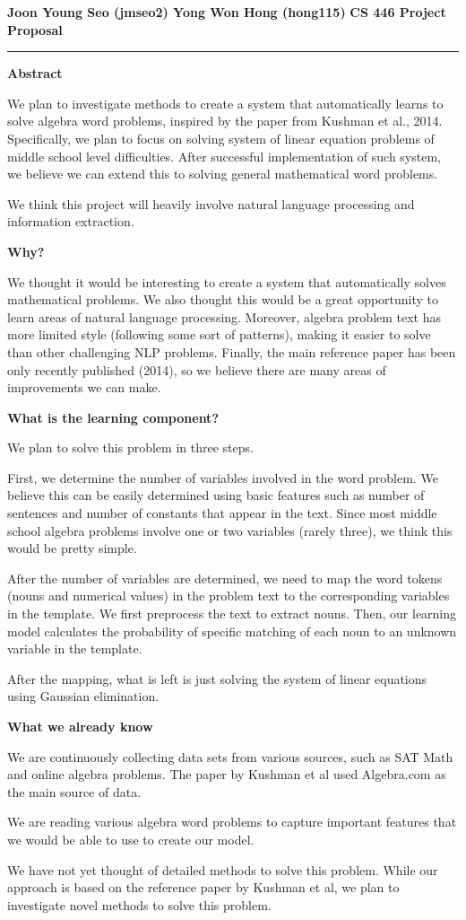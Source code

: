 \documentclass{article}
\author{Joon Young Seo}
\date{Sept 1, 2012}
\begin{document}
{\bf Joon Young Seo (jmseo2) Yong Won Hong (hong115)} \newline
{\bf CS 446 Project Proposal} \newline
\hrule

{\bf Abstract}

We plan to investigate methods to create a system that automatically learns to solve algebra word problems, inspired by the paper from Kushman et al., 2014. Specifically, we plan to focus on solving system of linear equation problems of middle school level difficulties. After successful implementation of such system, we believe we can extend this to solving general mathematical word problems. 

We think this project will heavily involve natural language processing and information extraction.

{\bf Why?}

We thought it would be interesting to create a system that automatically solves mathematical problems. We also thought this would be a great opportunity to learn areas of natural language processing. Moreover, algebra problem text has more limited style (following some sort of patterns), making it easier to solve than other challenging NLP problems. Finally, the main reference paper has been only recently published (2014), so we believe there are many areas of improvements we can make.

{\bf What is the learning component?}

We plan to solve this problem in three steps.

First, we determine the number of variables involved in the word problem. We believe this can be easily determined using basic features such as number of sentences and number of constants that appear in the text. Since most middle school algebra problems involve one or two variables (rarely three), we think this would be pretty simple.

After the number of variables are determined, we need to map the word tokens (nouns and numerical values) in the problem text to the corresponding variables in the template. We first preprocess the text to extract nouns. Then, our learning model calculates the probability of specific matching of each noun to an unknown variable in the template. 

After the mapping, what is left is just solving the system of linear equations using Gaussian elimination.

{\bf What we already know}

We are continuously collecting data sets from various sources, such as SAT Math and online algebra problems.  The paper by Kushman et al used Algebra.com as the main source of data.

We are reading various algebra word problems to capture important features that we would be able to use to create our model. 

We have not yet thought of detailed methods to solve this problem. While our approach is based on the reference paper by Kushman et al, we plan to investigate novel methods to solve this problem.
\end{document}

